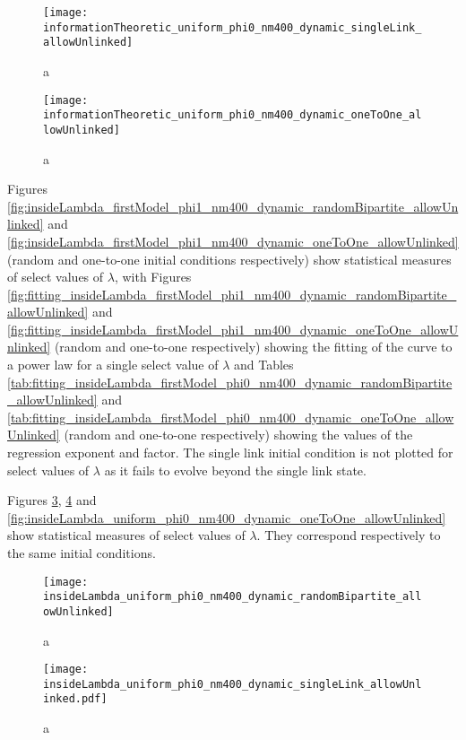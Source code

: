 \begin{figure}
  \centering
  \texttt{[image: informationTheoretic\_uniform\_phi0\_nm400\_dynamic\_singleLink\_allowUnlinked]}
  \caption{a}
  \label{fig:informationTheoretic_uniform_phi0_nm400_dynamic_singleLink_allowUnlinked}
\end{figure}

\begin{figure}
  \centering
  \texttt{[image: informationTheoretic\_uniform\_phi0\_nm400\_dynamic\_oneToOne\_allowUnlinked]}
  \caption{a}
  \label{fig:informationTheoretic_uniform_phi0_nm400_dynamic_oneToOne_allowUnlinked}
\end{figure}


Figures \ref{fig:insideLambda_firstModel_phi1_nm400_dynamic_randomBipartite_allowUnlinked} and \ref{fig:insideLambda_firstModel_phi1_nm400_dynamic_oneToOne_allowUnlinked} (random and one-to-one initial conditions respectively) show statistical measures of select values of $\lambda$, with Figures \ref{fig:fitting_insideLambda_firstModel_phi1_nm400_dynamic_randomBipartite_allowUnlinked} and \ref{fig:fitting_insideLambda_firstModel_phi1_nm400_dynamic_oneToOne_allowUnlinked} (random and one-to-one respectively) showing the fitting of the curve to a power law for a single select value of $\lambda$ and Tables \ref{tab:fitting_insideLambda_firstModel_phi0_nm400_dynamic_randomBipartite_allowUnlinked} and \ref{tab:fitting_insideLambda_firstModel_phi0_nm400_dynamic_oneToOne_allowUnlinked} (random and one-to-one respectively) showing the values of the regression exponent and factor.
The single link initial condition is not plotted for select values of $\lambda$ as it fails to evolve beyond the single link state.


Figures \ref{fig:insideLambda_uniform_phi0_nm400_dynamic_randomBipartite_allowUnlinked}, \ref{fig:insideLambda_uniform_phi0_nm400_dynamic_singleLink_allowUnlinked} and \ref{fig:insideLambda_uniform_phi0_nm400_dynamic_oneToOne_allowUnlinked} show statistical measures of select values of $\lambda$.
They correspond respectively to the same initial conditions.

\begin{figure}
  \centering
  \texttt{[image: insideLambda\_uniform\_phi0\_nm400\_dynamic\_randomBipartite\_allowUnlinked]}
  \caption{a}
  \label{fig:insideLambda_uniform_phi0_nm400_dynamic_randomBipartite_allowUnlinked}
\end{figure}

\begin{figure}
  \centering
  \texttt{[image: insideLambda\_uniform\_phi0\_nm400\_dynamic\_singleLink\_allowUnlinked.pdf]}
  \caption{a}
  \label{fig:insideLambda_uniform_phi0_nm400_dynamic_singleLink_allowUnlinked}
\end{figure}

